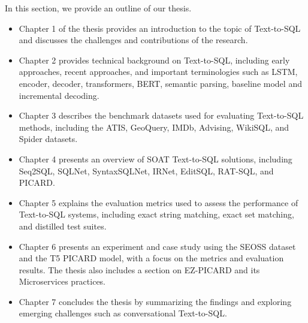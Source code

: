 In this section, we provide an outline of our thesis.

\begin{itemize}
    \item Chapter 1 of the thesis provides an introduction to the topic of Text-to-SQL and discusses the challenges and contributions of the research.
    \item Chapter 2 provides technical background on Text-to-SQL, including early approaches, recent approaches, and important terminologies such as LSTM, encoder, decoder, transformers, BERT, semantic parsing, baseline model and incremental decoding.
    \item Chapter 3 describes the benchmark datasets used for evaluating Text-to-SQL methods, including the ATIS, GeoQuery, IMDb, Advising, WikiSQL, and Spider datasets.
    \item Chapter 4 presents an overview of SOAT Text-to-SQL solutions, including Seq2SQL, SQLNet, SyntaxSQLNet, IRNet, EditSQL, RAT-SQL, and PICARD.
    \item Chapter 5 explains the evaluation metrics used to assess the performance of Text-to-SQL systems, including exact string matching, exact set matching, and distilled test suites.
    \item Chapter 6 presents an experiment and case study using the SEOSS dataset and the T5 PICARD model, with a focus on the metrics and evaluation results. The thesis also includes a section on EZ-PICARD and its Microservices practices.
    \item Chapter 7 concludes the thesis by summarizing the findings and exploring emerging challenges such as conversational Text-to-SQL.
\end{itemize}
